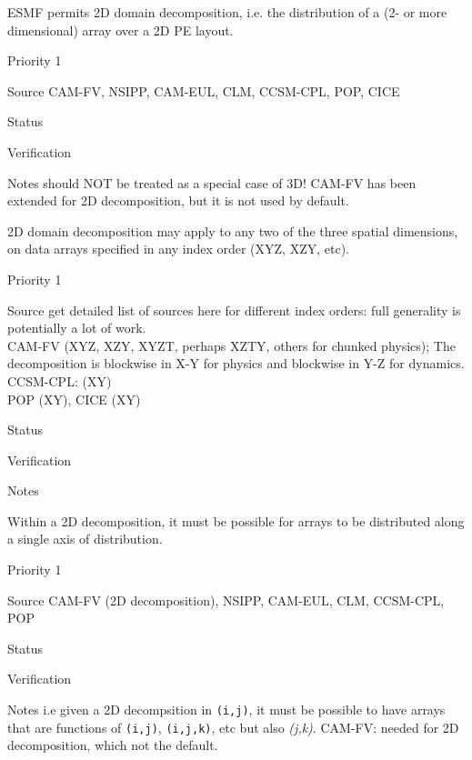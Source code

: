 
ESMF permits 2D domain decomposition, i.e. the distribution of a
(2- or more dimensional) array over a 2D PE layout.

\begin{reqlist}
\item[Priority] 1
\item[Source] CAM-FV, NSIPP, CAM-EUL, CLM, CCSM-CPL, POP, CICE \\
\item[Status]
\item[Verification]
\item[Notes] should NOT be treated as a special case of 3D!
	CAM-FV has been extended for 2D decomposition, but 
	it is not used by default.
\end{reqlist}


2D domain decomposition may apply to any two of the three spatial
dimensions, on data arrays specified in any index order (XYZ, XZY,
etc).

\begin{reqlist}
\item[Priority] 1
\item[Source] get detailed list of sources here for different index
  orders: full generality is potentially a lot of work. \\
  CAM-FV  (XYZ, XZY, XYZT, perhaps XZTY, others for chunked physics);
  The decomposition is blockwise in X-Y for physics and blockwise in 
  Y-Z for dynamics.  \\
  CCSM-CPL: (XY) \\
  POP (XY), CICE (XY)
\item[Status]
\item[Verification]
\item[Notes]
\end{reqlist}


Within a 2D decomposition, it must be possible for arrays to be
distributed along a single axis of distribution.

\begin{reqlist}
\item[Priority] 1
\item[Source] CAM-FV (2D decomposition), NSIPP, CAM-EUL, CLM, CCSM-CPL, POP \\
\item[Status]
\item[Verification]
\item[Notes] i.e given a 2D decompsition in \texttt{(i,j)}, it must be
  possible to have arrays that are functions of \texttt{(i,j)},
  \texttt{(i,j,k)}, etc but also \emph{(j,k)}.  CAM-FV: needed for
  2D decomposition, which not the default.
\end{reqlist}

